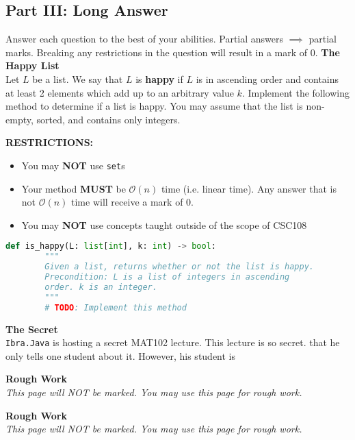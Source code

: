 \documentclass[letterpaper,12pt,addpoints]{exam}
\begin{document}
\begin{questions}
    \section*{Part III: Long Answer} 
    \setcounter{question}{0}
    Answer each question to the best of your abilities. Partial answers $\implies$ partial marks. Breaking any restrictions in the question will result in a mark of 0.
    \question[10] \textbf{The Happy List} \\
    Let $L$ be a list. We say that $L$ is \textbf{happy} if $L$ is in ascending order and contains at least 2 elements which add up to an arbitrary value $k$. Implement the following method to determine if a list is happy. You may assume that the list is non-empty, sorted, and contains only integers.

    \begin{center}
        
        \textbf{RESTRICTIONS:}
        \begin{itemize}
            \item You may \textbf{NOT} use \texttt{set}s
            \item Your method \textbf{MUST} be $\mathcal{O}(n)$ time (i.e. linear time). Any answer that is not $\mathcal{O}(n)$ time will receive a mark of 0.
            \item You may \textbf{NOT} use concepts taught outside of the scope of CSC108
        \end{itemize}
    \end{center}

    \begin{lstlisting}[language=Python, style=mystyle]
    def is_happy(L: list[int], k: int) -> bool:
        """
        Given a list, returns whether or not the list is happy.
        Precondition: L is a list of integers in ascending 
        order. k is an integer.
        """
        # TODO: Implement this method
    \end{lstlisting}

    \clearpage
    \question[10] \textbf{The Secret} \\
    \texttt{Ibra.Java} is hosting a secret MAT102 lecture. This lecture is so secret. that he only tells one student about it. However, his student is 


    \end{questions}

    \clearpage
    \begin{center}
        \textbf{Rough Work}\\
        \textit{This page will NOT be marked. You may use this page for rough work.}
    \end{center}

    \clearpage
    \begin{center}
        \textbf{Rough Work}\\
        \textit{This page will NOT be marked. You may use this page for rough work.}
    \end{center}
\end{document}
